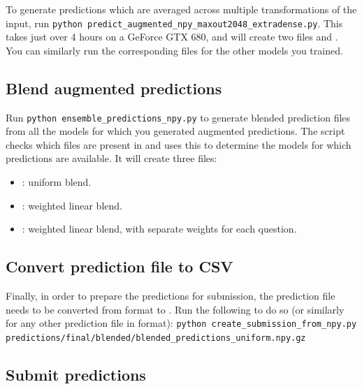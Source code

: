 \documentclass[a4paper,10pt]{article}
\begin{document}
To generate predictions which are averaged across multiple transformations of the input, run \texttt{python predict\_augmented\_npy\_maxout2048\_extradense.py}. This takes just over 4 hours on a GeForce GTX 680, and will create two files  and  . You can similarly run the corresponding  files for the other models you trained. 

\subsection{Blend augmented predictions}

Run \texttt{python ensemble\_predictions\_npy.py} to generate blended prediction files from all the models for which you generated augmented predictions. The script checks which files are present in  and uses this to determine the models for which predictions are available. It will create three files:
\begin{itemize}
 \item {}: uniform blend.
 \item {}: weighted linear blend.
 \item {}: weighted linear blend, with separate weights for each question.
\end{itemize}

\subsection{Convert prediction file to CSV}

Finally, in order to prepare the predictions for submission, the prediction file needs to be converted from  format to . Run the following to do so (or similarly for any other prediction file in  format): \texttt{python create\_submission\_from\_npy.py} \\ \texttt{predictions/final/blended/blended\_predictions\_uniform.npy.gz}


\subsection{Submit predictions}
\end{document}
